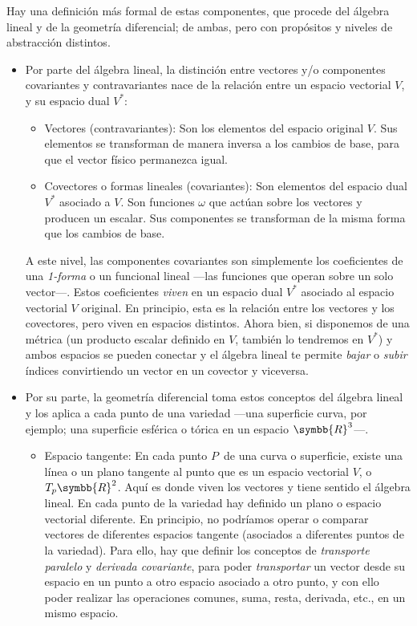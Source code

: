 Hay una definición más formal de estas componentes, que procede del álgebra lineal y de
la geometría diferencial; de ambas, pero con propósitos y niveles de abstracción
distintos.
\begin{itemize}
\item Por parte del álgebra lineal, la distinción entre vectores y/o componentes
  covariantes y contravariantes nace de la relación entre un espacio vectorial $V$, y su
  espacio dual $V^*$:
\begin{itemize}
\item Vectores (contravariantes): Son los elementos del espacio original $V$. Sus
  elementos se transforman de manera inversa a los cambios de base, para que el vector
  físico permanezca igual.
\item Covectores o formas lineales (covariantes): Son elementos del espacio dual $V^*$
  asociado a $V$. Son funciones $\omega$ que actúan sobre los vectores y producen un
  escalar. Sus componentes se transforman de la misma forma que los cambios de base.
\end{itemize}
A este nivel, las componentes covariantes son simplemente los coeficientes de una
\emph{1-forma} o un funcional lineal ---las funciones que operan sobre un solo vector---.
Estos coeficientes \emph{viven} en un espacio dual $V^*$ asociado al espacio vectorial
$V$ original. En principio, esta es la relación entre los vectores y los covectores,
pero viven en espacios distintos. Ahora bien, si disponemos de una métrica (un producto
escalar definido en $V$, también lo tendremos en $V^*$) y ambos espacios se pueden
conectar y el álgebra lineal te permite \emph{bajar} o \emph{subir} índices convirtiendo
un vector en un covector y viceversa.

\item Por su parte, la geometría diferencial toma estos conceptos del álgebra lineal y
  los aplica a cada punto de una variedad ---una superficie curva, por ejemplo; una
  superficie esférica o tórica en un espacio $\symbb{R}^3$---.
  \begin{itemize}
  \item Espacio tangente: En cada punto $P$\, de una curva o superficie, existe una
    línea o un plano tangente al punto que es un espacio vectorial $V$, o
    $T_p\symbb{R}^2$. Aquí es donde viven los vectores y tiene sentido el álgebra
    lineal. En cada punto de la variedad hay definido un plano o espacio vectorial
    diferente. En principio, no podríamos operar o comparar vectores de diferentes
    espacios tangente (asociados a diferentes puntos de la variedad). Para ello, hay que
    definir los conceptos de \emph{transporte paralelo} y \emph{derivada covariante},
    para poder \emph{transportar} un vector desde su espacio en un punto a otro espacio
    asociado a otro punto, y con ello poder realizar las operaciones comunes, suma,
    resta, derivada, etc., en un mismo espacio.


\end{itemize}
\end{itemize}
